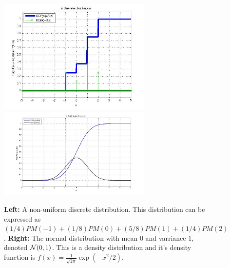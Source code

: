 \documentclass{report}
\theoremstyle{plain}
\theoremstyle{definition}
\begin{document}
\begin{figure}[b]
\begin{center}
\includegraphics[width=3in]{figs/Discrete2.jpg}
\includegraphics[width=3in]{figs/Normal.jpg}
\end{center}
\caption{{\bf Left:} A non-uniform discrete distribution. This
  distribution can be expressed as
  $(1/4)PM(-1)+(1/8)PM(0)+(5/8)PM(1)+(1/4)PM(2)$. {\bf Right:} The
  normal distribution with mean $0$ and varriance 1, denoted ${\cal
  N}(0,1)$. This is a density distribution and it's density function
is $f(x) = \frac{1}{\sqrt{2\pi}} \exp(-x^2/2)$.}
\end{figure}
\end{document}
